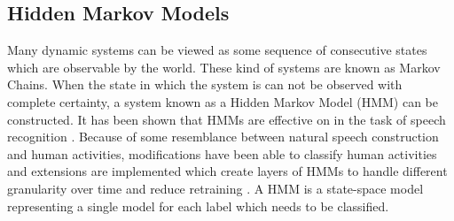 \subsection{Hidden Markov Models}
Many dynamic systems can be viewed as some sequence of consecutive states
which are observable by the world. These kind of systems are known as Markov
Chains. When the state in which the system is can not be observed with
complete certainty, a system known as a Hidden Markov Model (HMM) can be
constructed. It has been shown that HMMs are effective on in the task of
speech recognition \cite{rabiner1989tutorial}. Because of some resemblance
between natural speech construction and human activities, modifications have
been able to classify human activities \cite{guenterberg2009distributed} and
extensions are implemented which create layers of HMMs to handle different
granularity over time and reduce retraining
\cite{oliver2002layered,perdikis2008recognition}. A HMM is a state-space model
representing a single model for each label which needs to be classified.

